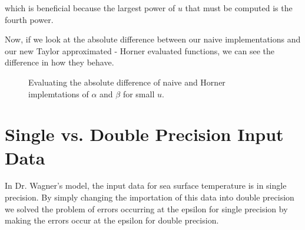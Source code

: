 \documentclass[12pt]{article}
\begin{document}
which is beneficial because the largest power of $u$ that must be 
computed is the fourth power. \clearpage%

Now, if we look at the absolute difference between our naive 
implementations and our new Taylor approximated - Horner evaluated 
functions, we can see the difference in how they behave.

    \begin{figure}[h]
        \centering
        \caption{Evaluating the absolute difference of naive 
                and Horner implemtations of $\alpha$ and $\beta$ for 
                small $u$.}
        \label{fig:absolute_difference}
    \end{figure}

\clearpage
\section{Single vs. Double Precision Input Data}
In Dr. Wagner's model, the input data for sea surface temperature is in
single precision. By simply changing the importation of this data into
double precision we solved the problem of errors occurring at the 
epsilon for single precision by making the errors occur at the epsilon
for double precision.
\end{document}

